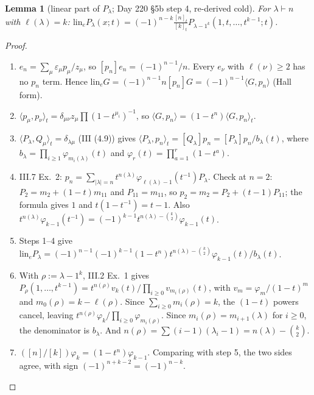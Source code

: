 \documentclass[10pt]{article}
\newcommand{\lin}{\mathrm{lin}_e}
\newtheorem{lemma}{Lemma}[section]
\begin{document}
\begin{lemma}[linear part of $P_\lambda$; Day 220 \S5b step 4, re-derived cold]
For $\lambda\vdash n$ with $\ell(\lambda)=k$:
$\lin P_\lambda(x;t)=(-1)^{n-k}\frac{[n]_t}{[k]_t}P_{\lambda-1^k}(1,t,\dots,t^{k-1};t)$.
\end{lemma}
\begin{proof}
\begin{enumerate}
\item $e_n=\sum_\mu\varepsilon_\mu p_\mu/z_\mu$, so $[p_n]e_n=(-1)^{n-1}/n$. Every $e_\nu$ with $\ell(\nu)\ge2$ has no
  $p_n$ term. Hence $\lin G=(-1)^{n-1}n[p_n]G=(-1)^{n-1}\langle G,p_n\rangle$ (Hall form).
\item $\langle p_\mu,p_\nu\rangle_t=\delta_{\mu\nu}z_\mu\prod(1-t^{\mu_i})^{-1}$, so $\langle G,p_n\rangle=(1-t^n)\langle G,p_n\rangle_t$.
\item $\langle P_\lambda,Q_\mu\rangle_t=\delta_{\lambda\mu}$ (III (4.9)) gives
  $\langle P_\lambda,p_n\rangle_t=[Q_\lambda]p_n=[P_\lambda]p_n/b_\lambda(t)$, where $b_\lambda=\prod_{i\ge1}\varphi_{m_i(\lambda)}(t)$ and
  $\varphi_r(t)=\prod_{a=1}^r(1-t^a)$.
\item III.7 Ex.~2: $p_n=\sum_{|\lambda|=n}t^{n(\lambda)}\varphi_{\ell(\lambda)-1}(t^{-1})P_\lambda$. Check at $n=2$:
  $P_2=m_2+(1-t)m_{11}$ and $P_{11}=m_{11}$, so $p_2=m_2=P_2+(t-1)P_{11}$; the formula gives $1$ and $t(1-t^{-1})=t-1$.
  Also $t^{n(\lambda)}\varphi_{k-1}(t^{-1})=(-1)^{k-1}t^{n(\lambda)-\binom k2}\varphi_{k-1}(t)$.
\item Steps 1--4 give $\lin P_\lambda=(-1)^{n-1}(-1)^{k-1}(1-t^n)t^{n(\lambda)-\binom k2}\varphi_{k-1}(t)/b_\lambda(t)$.
\item With $\rho:=\lambda-1^k$, III.2 Ex.~1 gives $P_\rho(1,\dots,t^{k-1})=t^{n(\rho)}v_k(t)/\prod_{i\ge0}v_{m_i(\rho)}(t)$, with
  $v_m=\varphi_m/(1-t)^m$ and $m_0(\rho)=k-\ell(\rho)$. Since $\sum_{i\ge0}m_i(\rho)=k$, the $(1-t)$ powers cancel,
  leaving $t^{n(\rho)}\varphi_k/\prod_{i\ge0}\varphi_{m_i(\rho)}$. Since $m_i(\rho)=m_{i+1}(\lambda)$ for $i\ge0$, the
  denominator is $b_\lambda$. And $n(\rho)=\sum(i-1)(\lambda_i-1)=n(\lambda)-\binom k2$.
\item $([n]/[k])\varphi_k=(1-t^n)\varphi_{k-1}$. Comparing with step 5, the two sides agree, with sign
  $(-1)^{n+k-2}=(-1)^{n-k}$.\qedhere
\end{enumerate}
\end{proof}
\end{document}

